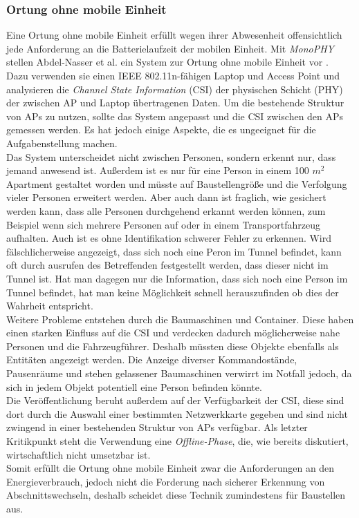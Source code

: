 \subsubsection{Ortung ohne mobile Einheit}
\label{ch:Vorherige:sec:CSI}
Eine Ortung ohne mobile Einheit erfüllt wegen ihrer Abwesenheit offensichtlich jede Anforderung an die Batterielaufzeit der mobilen Einheit.
Mit \emph{MonoPHY} stellen Abdel-Nasser et al. ein System zur Ortung ohne mobile Einheit vor \cite{abdel2013monophy}. \\
Dazu verwenden sie einen IEEE 802.11n-fähigen Laptop und Access Point und analysieren die \emph{Channel State Information} (CSI) der physischen Schicht (PHY) der zwischen AP und Laptop übertragenen Daten.
Um die bestehende Struktur von APs zu nutzen, sollte das System angepasst und die CSI zwischen den APs gemessen werden.
Es hat jedoch einige Aspekte, die es ungeeignet für die Aufgabenstellung machen.\\
Das System unterscheidet nicht zwischen Personen, sondern erkennt nur, dass jemand anwesend ist. 
Außerdem ist es nur für eine Person in einem 100 $m^2$ Apartment gestaltet worden und müsste auf Baustellengröße und die Verfolgung vieler Personen erweitert werden.
Aber auch dann ist fraglich, wie gesichert werden kann, dass alle Personen durchgehend erkannt werden können, zum Beispiel wenn sich mehrere Personen auf oder in einem Transportfahrzeug aufhalten.
Auch ist es ohne Identifikation schwerer Fehler zu erkennen. 
Wird fälschlicherweise angezeigt, dass sich noch eine Peron im Tunnel befindet, kann oft durch ausrufen des Betreffenden festgestellt werden, dass dieser nicht im Tunnel ist. 
Hat man dagegen nur die Information, dass sich noch eine Person im Tunnel befindet, hat man keine Möglichkeit schnell herauszufinden ob dies der Wahrheit entspricht.\\
Weitere Probleme entstehen durch die Baumaschinen und Container. 
Diese haben einen starken Einfluss auf die CSI und verdecken dadurch möglicherweise nahe Personen und die Fahrzeugführer.
Deshalb müssten diese Objekte ebenfalls als Entitäten angezeigt werden. 
Die Anzeige diverser Kommandostände, Pausenräume und stehen gelassener Baumaschinen verwirrt im Notfall jedoch, da sich in jedem Objekt potentiell eine Person befinden könnte.\\
Die Veröffentlichung beruht außerdem auf der Verfügbarkeit der CSI, diese sind dort durch die Auswahl einer bestimmten Netzwerkkarte gegeben und sind nicht zwingend in einer bestehenden Struktur von APs verfügbar.
Als letzter Kritikpunkt steht die Verwendung eine \emph{Offline-Phase}, die, wie bereits diskutiert, wirtschaftlich nicht umsetzbar ist. \\ 
Somit erfüllt die Ortung ohne mobile Einheit zwar die Anforderungen an den Energieverbrauch, jedoch nicht die Forderung nach sicherer Erkennung von Abschnittswechseln, deshalb scheidet diese Technik zumindestens für Baustellen aus.




